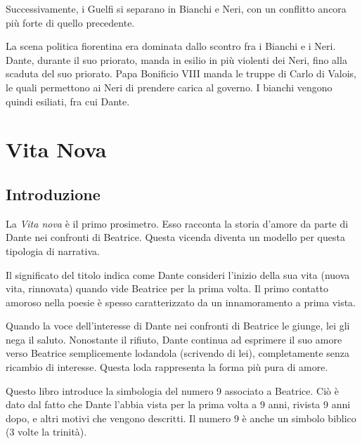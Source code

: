 \documentclass[a4paper]{article}
\begin{document}
Successivamente, i Guelfi si separano in Bianchi e Neri, con un conflitto ancora più forte di quello precedente.

La scena politica fiorentina era dominata dallo scontro fra i Bianchi e i Neri.
Dante, durante il suo priorato, manda in esilio in più violenti dei Neri, fino alla scaduta del suo priorato.
Papa Bonificio VIII manda le truppe di Carlo di Valois, le quali permettono ai Neri di prendere carica al governo.
I bianchi vengono quindi esiliati, fra cui Dante. 


\pagebreak

\section{Vita Nova}

\subsection{Introduzione}



La \textit{Vita nova} è il primo prosimetro. Esso racconta la storia d'amore da parte di Dante
nei confronti di Beatrice.
Questa vicenda diventa un modello per questa tipologia di narrativa.

Il significato del titolo indica come Dante consideri l'inizio della sua vita (nuova vita, rinnovata)
quando vide Beatrice per la prima volta.
Il primo contatto amoroso nella poesie è spesso caratterizzato da un innamoramento a prima vista.

Quando la voce dell'interesse di Dante nei confronti di Beatrice le giunge, lei gli nega il saluto.
Nonostante il rifiuto, Dante continua ad esprimere il suo amore verso Beatrice semplicemente
lodandola (scrivendo di lei), completamente senza ricambio di interesse.
Questa loda rappresenta la forma più pura di amore.

Questo libro introduce la simbologia del numero 9 associato a Beatrice.
Ciò è dato dal fatto che Dante l'abbia vista per la prima volta a 9 anni, rivista 9 anni dopo,
e altri motivi che vengono descritti. Il numero 9 è anche un simbolo biblico (3 volte la trinità).
\end{document}
